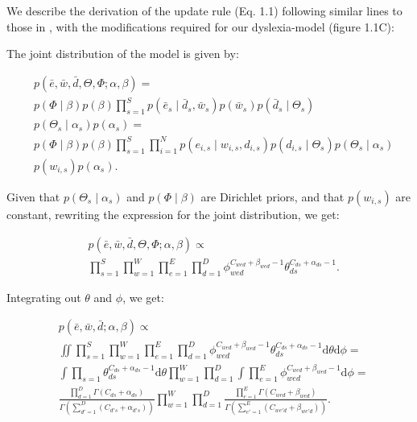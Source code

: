 {We describe the derivation of the update rule (Eq. 1.1) following similar lines to those in \citet{gs04}, with the modifications required for our dyslexia-model (figure 1.1C):

The joint distribution of the model is given by:

\begin{equation*}
\begin{split}
&p(\bar{e},\bar{w},\bar{d},\Theta,\Phi;\alpha,\beta) = \\
&p(\Phi\mid\beta)p(\beta)\prod_{s = 1}^S p(\bar{e}_s\mid\bar{d}_s, \bar{w}_s) p(\bar{w}_s)p(\bar{d}_s\mid\Theta_s)\\ &p(\Theta_s\mid\alpha_s)p(\alpha_s) = \\
&p(\Phi\mid\beta) p(\beta) \prod_{s = 1}^S \prod_{i=1}^N p(e_{i, s} \mid w_{i, s}, d_{i, s}) p(d_{i, s}\mid\Theta_s) p(\Theta_s\mid\alpha_s)\\
&p(w_{i, s}) p(\alpha_s).
\end{split}
\end{equation*}

Given that $p(\Theta_s\mid\alpha_s)$ and $p(\Phi\mid\beta)$ are Dirichlet priors, and that $p(w_{i, s})$ are constant, rewriting the expression for the joint distribution, we get:

\begin{equation*}
\begin{split}
&p(\bar{e}, \bar{w}, \bar{d}, \Theta, \Phi; \alpha, \beta) \propto \\
&\prod_{s=1}^S \prod_{w=1}^W \prod_{e=1}^E \prod_{d = 1}^D \phi_{wed}^{C_{wed} + \beta_{wed} - 1} \theta_{ds}^{C_{ds} + \alpha_{ds} - 1}.
\end{split}
\end{equation*}

Integrating out $\theta$ and $\phi$, we get:

\begin{equation*}
\begin{split}
&p(\bar{e},\bar{w},\bar{d};\alpha,\beta) \propto \\
&\iint \prod_{s=1}^S \prod_{w=1}^W \prod_{e=1}^E \prod_{d = 1}^D  \phi_{wed}^{C_{wed} + \beta_{wed} - 1} \theta_{ds}^{C_{ds} + \alpha_{ds} - 1} \mathrm{d}\theta \mathrm{d}\phi = \\
&\int \prod_{s=1} \theta_{ds}^{C_{ds} + \alpha_{ds} - 1} \mathrm{d}\theta \prod_{w=1}^W \prod_{d = 1}^D \int\prod_{e=1}^E \phi_{wed}^{C_{wed} + \beta_{wed} - 1} \mathrm{d}\phi = \\
&\frac{\prod_{d = 1}^D\Gamma(C_{ds} + \alpha_{ds})}{\Gamma(\sum_{d' = 1}^D (C_{d's} + \alpha_{d's}))}\prod_{w=1}^W\prod_{d = 1}^D \frac{\prod_{e = 1}^E\Gamma(C_{wed} + \beta_{wed})}{\Gamma(\sum_{e' = 1}^E (C_{we'd} + \beta_{we'd}))}.
\end{split}
\end{equation*}

}
